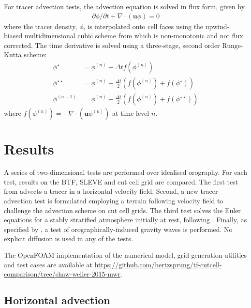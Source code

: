 \documentclass{ametsoc}
\begin{document}
For tracer advection tests, the advection equation is solved in flux form, given by
\begin{align}
\partial \phi / \partial t + \nabla \cdot \left( \bm{u} \phi \right) = 0
\end{align}
where the tracer density, $\phi$, is interpolated onto cell faces using the upwind-biased multidimensional cubic scheme from \citet{weller-shahrokhi2014} which is non-monotonic and not flux corrected.
The time derivative is solved using a three-stage, second order Runge-Kutta scheme:
\begin{subequations}
\begin{align}
	\phi^\star &= \phi^{(n)} + \Delta t f(\phi^{(n)}) \\
	\phi^{\star\star} &= \phi^{(n)} + \frac{\Delta t}{2} \left( f(\phi^{(n)}) + f(\phi^\star) \right) \\
	\phi^{(n+1)} &= \phi^{(n)} + \frac{\Delta t}{2} \left( f(\phi^{(n)}) + f(\phi^{\star\star}) \right)
\end{align}
\end{subequations}
where \(f(\phi^{(n)}) = - \nabla \cdot (\bm{u} \phi^{(n)})\) at time level \(n\).

\section{Results}
\label{sec:results}

A series of two-dimensional tests are performed over idealised orography.  For each test, results on the BTF, SLEVE and cut cell grid are compared.  The first test from \citet{schaer2002} advects a tracer in a horizontal velocity field.  Second, a new tracer advection test is formulated employing a terrain following velocity field to challenge the advection scheme on cut cell grids.  The third test solves the Euler equations for a stably stratified atmosphere initially at rest, following \citet{klemp2011}.  Finally, as specified by \citet{schaer2002}, a test of orographically-induced gravity waves is performed.  No explicit diffusion is used in any of the tests.

The OpenFOAM implementation of the numerical model, grid generation utilities and test cases are available at \url{https://github.com/hertzsprung/tf-cutcell-comparison/tree/shaw-weller-2015-mwr}.


\subsection{Horizontal advection}
\end{document}
